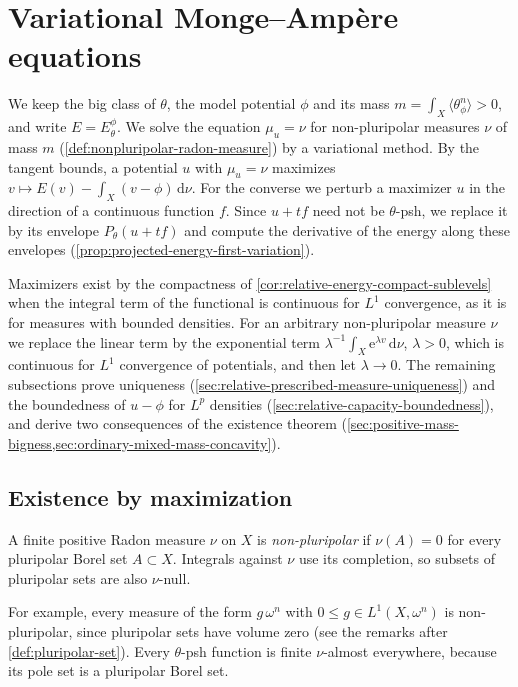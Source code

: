 \section{Variational Monge--Amp\`ere equations}
\label{sec:relative-variational-equations}
We keep the big class of $\theta$, the model potential $\phi$ and its mass $m=\int_X\langle\theta_\phi^n\rangle>0$, and write $E=E_\theta^\phi$. We solve the equation $\mu_u=\nu$ for non-pluripolar measures $\nu$ of mass $m$ (\cref{def:nonpluripolar-radon-measure}) by a variational method. By the tangent bounds, a potential $u$ with $\mu_u=\nu$ maximizes $v\mapsto E(v)-\int_X(v-\phi)\,\mathrm d\nu$. For the converse we perturb a maximizer $u$ in the direction of a continuous function $f$. Since $u+tf$ need not be $\theta$-psh, we replace it by its envelope $P_\theta(u+tf)$ and compute the derivative of the energy along these envelopes (\cref{prop:projected-energy-first-variation}).

Maximizers exist by the compactness of \cref{cor:relative-energy-compact-sublevels} when the integral term of the functional is continuous for $L^1$ convergence, as it is for measures with bounded densities. For an arbitrary non-pluripolar measure $\nu$ we replace the linear term by the exponential term $\lambda^{-1}\int_X\mathrm e^{\lambda v}\,\mathrm d\nu$, $\lambda>0$, which is continuous for $L^1$ convergence of potentials, and then let $\lambda\to0$. The remaining subsections prove uniqueness (\cref{sec:relative-prescribed-measure-uniqueness}) and the boundedness of $u-\phi$ for $L^p$ densities (\cref{sec:relative-capacity-boundedness}), and derive two consequences of the existence theorem (\cref{sec:positive-mass-bigness,sec:ordinary-mixed-mass-concavity}).

\subsection{Existence by maximization}
\label{sec:relative-variational-existence}

\begin{definition}\label{def:nonpluripolar-radon-measure}
A finite positive Radon measure $\nu$ on $X$ is \emph{non-pluripolar} if $\nu(A)=0$ for every pluripolar Borel set $A\subset X$. Integrals against $\nu$ use its completion, so subsets of pluripolar sets are also $\nu$-null.
\end{definition}
For example, every measure of the form $g\,\omega^n$ with $0\leq g\in L^1(X,\omega^n)$ is non-pluripolar, since pluripolar sets have volume zero (see the remarks after \cref{def:pluripolar-set}). Every $\theta$-psh function is finite $\nu$-almost everywhere, because its pole set is a pluripolar Borel set.

